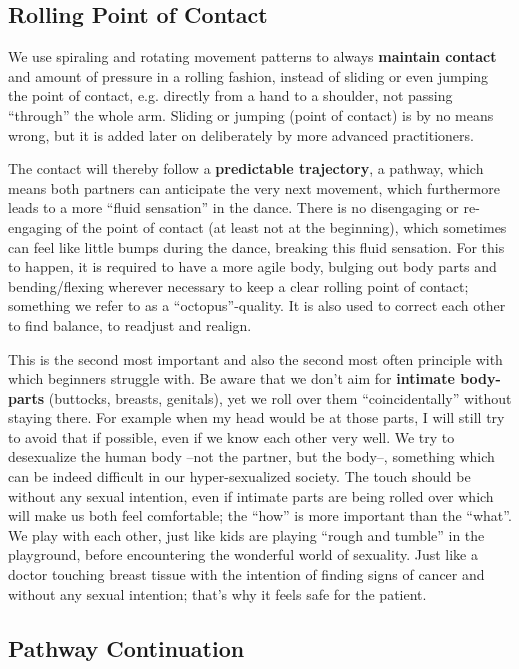 \subsection{Rolling Point of Contact}\label{subsec:rolling-point-of-contact}

We use spiraling and rotating movement patterns to always \textbf{maintain contact} and amount of pressure in a rolling fashion, instead of sliding or even jumping the point of contact, e.g. directly from a hand to a shoulder, not passing ``through'' the whole arm.
Sliding or jumping (point of contact) is by no means wrong, but it is added later on deliberately by more advanced practitioners.

The contact will thereby follow a \textbf{predictable trajectory}, a pathway, which means both partners can anticipate the very next movement, which furthermore leads to a more ``fluid sensation'' in the dance.
There is no disengaging or re-engaging of the point of contact (at least not at the beginning), which sometimes can feel like little bumps during the dance, breaking this fluid sensation.
For this to happen, it is required to have a more agile body, bulging out body parts and bending/flexing wherever necessary to keep a clear rolling point of contact; something we refer to as a ``octopus''-quality.
It is also used to correct each other to find balance, to readjust and realign.

This is the second most important and also the second most often principle with which beginners struggle with.
Be aware that we don't aim for \textbf{intimate body-parts} (buttocks, breasts, genitals), yet we roll over them ``coincidentally'' without staying there.
For example when my head would be at those parts, I will still try to avoid that if possible, even if we know each other very well.
We try to desexualize the human body --not the partner, but the body--, something which can be indeed difficult in our hyper-sexualized society.
The touch should be without any sexual intention, even if intimate parts are being rolled over which will make us both feel comfortable; the ``how'' is more important than the ``what''.
We play with each other, just like kids are playing ``rough and tumble'' in the playground, before encountering the wonderful world of sexuality.
Just like a doctor touching breast tissue with the intention of finding signs of cancer and without any sexual intention; that's why it feels safe for the patient.

\subsection{Pathway Continuation}\label{subsec:pathway-continuation}

